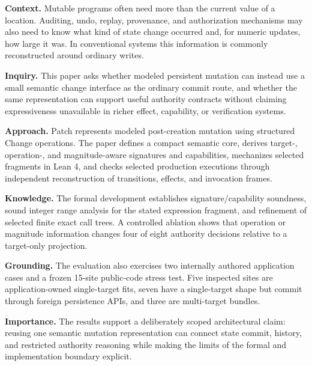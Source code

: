\textbf{Context.} Mutable programs often need more than the current value of a location. Auditing, undo, replay, provenance, and authorization mechanisms may also need to know what kind of state change occurred and, for numeric updates, how large it was. In conventional systems this information is commonly reconstructed around ordinary writes.

\textbf{Inquiry.} This paper asks whether modeled persistent mutation can instead use a small semantic change interface as the ordinary commit route, and whether the same representation can support useful authority contracts without claiming expressiveness unavailable in richer effect, capability, or verification systems.

\textbf{Approach.} Patch represents modeled post-creation mutation using structured Change operations. The paper defines a compact semantic core, derives target-, operation-, and magnitude-aware signatures and capabilities, mechanizes selected fragments in Lean 4, and checks selected production executions through independent reconstruction of transitions, effects, and invocation frames.

\textbf{Knowledge.} The formal development establishes signature/capability soundness, sound integer range analysis for the stated expression fragment, and refinement of selected finite exact call trees. A controlled ablation shows that operation or magnitude information changes four of eight authority decisions relative to a target-only projection.

\textbf{Grounding.} The evaluation also exercises two internally authored application cases and a frozen 15-site public-code stress test. Five inspected sites are application-owned single-target fits, seven have a single-target shape but commit through foreign persistence APIs, and three are multi-target bundles.

\textbf{Importance.} The results support a deliberately scoped architectural claim: reusing one semantic mutation representation can connect state commit, history, and restricted authority reasoning while making the limits of the formal and implementation boundary explicit.

